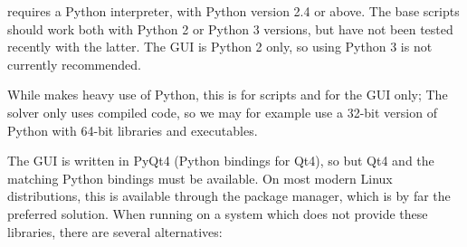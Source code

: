 \documentclass[a4paper,10pt,twoside]{csshortdoc}
\begin{document}
\CS requires a Python interpreter, with Python version 2.4 or above.
The base scripts should work both with Python 2 or Python 3 versions,
but have not been tested recently with the latter. The GUI is Python 2
only, so using Python 3 is not currently recommended.

While \CS makes heavy use of Python, this is for scripts and for the GUI only;
The solver only uses compiled code, so we may for example use
a 32-bit version of Python with 64-bit \CS libraries and executables.

The GUI is written in PyQt4 (Python bindings for Qt4), so but Qt4 and
the matching Python bindings must be available. On most modern
Linux distributions, this is available through the package manager,
which is by far the preferred solution. When running on a system which does
not provide these libraries, there are several alternatives:
\end{document}
